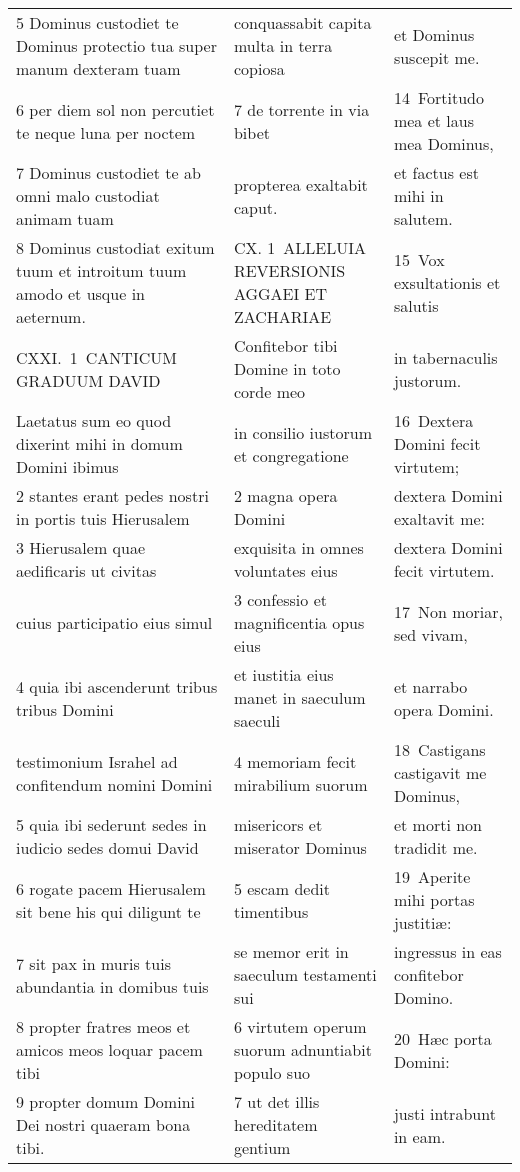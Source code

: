 \documentclass{article}
\begin{document}
\begin{longtable}{@{}p{}p{}p{}@{}}
5 Dominus custodiet te Dominus protectio tua super manum dexteram tuam	&	conquassabit capita multa in terra copiosa	&	et Dominus suscepit me.	\\
6 per diem sol non percutiet te neque luna per noctem	&	7 de torrente in via bibet	&	14 Fortitudo mea et laus mea Dominus,	\\
7 Dominus custodiet te ab omni malo custodiat animam tuam	&	propterea exaltabit caput.	&	et factus est mihi in salutem.	\\
8 Dominus custodiat exitum tuum et introitum tuum amodo et usque in aeternum.	&	CX. 1 ALLELUIA REVERSIONIS AGGAEI ET ZACHARIAE	&	15 Vox exsultationis et salutis	\\
CXXI. 1 CANTICUM GRADUUM DAVID	&	Confitebor tibi Domine in toto corde meo	&	in tabernaculis justorum.	\\
Laetatus sum eo quod dixerint mihi in domum Domini ibimus	&	in consilio iustorum et congregatione	&	16 Dextera Domini fecit virtutem;	\\
2 stantes erant pedes nostri in portis tuis Hierusalem	&	2 magna opera Domini	&	dextera Domini exaltavit me:	\\
3 Hierusalem quae aedificaris ut civitas	&	exquisita in omnes voluntates eius	&	dextera Domini fecit virtutem.	\\
cuius participatio eius simul	&	3 confessio et magnificentia opus eius	&	17 Non moriar, sed vivam,	\\
4 quia ibi ascenderunt tribus tribus Domini	&	et iustitia eius manet in saeculum saeculi	&	et narrabo opera Domini.	\\
testimonium Israhel ad confitendum nomini Domini	&	4 memoriam fecit mirabilium suorum	&	18 Castigans castigavit me Dominus,	\\
5 quia ibi sederunt sedes in iudicio sedes domui David	&	misericors et miserator Dominus	&	et morti non tradidit me.	\\
6 rogate pacem Hierusalem sit bene his qui diligunt te	&	5 escam dedit timentibus	&	19 Aperite mihi portas justitiæ:	\\
7 sit pax in muris tuis abundantia in domibus tuis	&	se memor erit in saeculum testamenti sui	&	ingressus in eas confitebor Domino.	\\
8 propter fratres meos et amicos meos loquar pacem tibi	&	6 virtutem operum suorum adnuntiabit populo suo	&	20 Hæc porta Domini:	\\
9 propter domum Domini Dei nostri quaeram bona tibi.	&	7 ut det illis hereditatem gentium	&	justi intrabunt in eam.	\\

\end{longtable}
\end{document}
